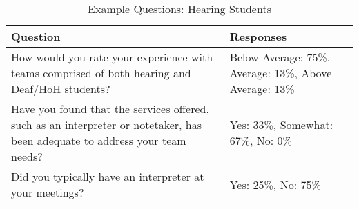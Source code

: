 \documentclass[conference]{IEEEtran}
\begin{document}

\begin{table}[h!]
\vspace{-0.05in}
\caption{Example Questions: Hearing Students}
\vspace{-0.1in}
\begin{center}
   \begin{tabular}{ p{22em} | p{10em} }

   Question  & Responses \\ \hline \hline
How would you rate your experience with teams comprised of both hearing and Deaf/HoH students? & Below Average: 75\%, Average: 13\%, Above Average: 13\% \\ \hline
Have you found that the services offered, such as an interpreter or notetaker, has been adequate to address your team needs? & Yes: 33\%, Somewhat: 67\%, No: 0\% \\ \hline
Did you typically have an interpreter at your meetings? & Yes: 25\%, No: 75\% \\ \hline

    \end{tabular}
\end{center}

\label{table:hearingQuestions}
\vspace{-0.1in}
\end{table}

%
\end{document}
